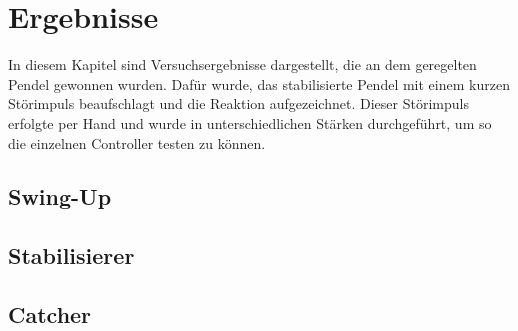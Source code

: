 \section{Ergebnisse}
In diesem Kapitel sind Versuchsergebnisse dargestellt, die an dem geregelten Pendel gewonnen wurden. Dafür wurde, das stabilisierte Pendel mit einem kurzen Störimpuls beaufschlagt und die Reaktion aufgezeichnet. Dieser Störimpuls erfolgte per Hand und wurde in unterschiedlichen Stärken durchgeführt, um so die einzelnen Controller testen zu können. 
\subsection{Swing-Up}
\subsection{Stabilisierer}
\subsection{Catcher}
